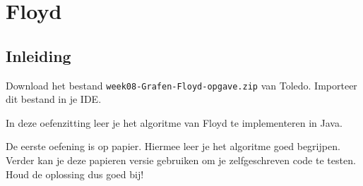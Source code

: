 
\chapter{Floyd}

\section*{Inleiding}
Download het bestand \verb/week08-Grafen-Floyd-opgave.zip/ van Toledo. Importeer dit bestand in je IDE.

In deze oefenzitting leer je het algoritme van Floyd te implementeren in Java.

De eerste oefening is op papier. Hiermee leer je het algoritme goed begrijpen. Verder kan je deze papieren versie gebruiken om je zelfgeschreven code te testen. Houd de oplossing dus goed bij!


